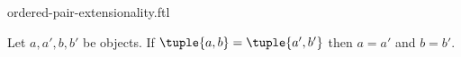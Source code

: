 \documentclass{article}
\begin{document}
\begin{smodule}[creators={Marcel Schütz}]{ordered-pair-extensionality.ftl}

  \begin{faxiom*}[label=8349357107576832]
    Let $a, a', b, b'$ be objects.
    If $\tuple{a,b} = \tuple{a',b'}$ then $a = a'$ and $b = b'$.
  \end{faxiom*}
\end{smodule}
\end{document}
